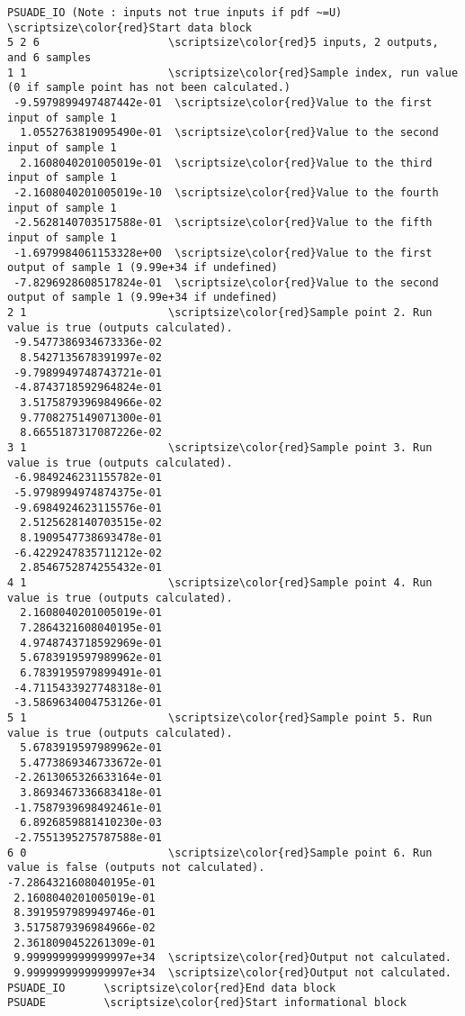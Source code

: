 \begin{Verbatim}[commandchars=\\\{\}]
PSUADE_IO (Note : inputs not true inputs if pdf ~=U) \scriptsize\color{red}Start data block
5 2 6                    \scriptsize\color{red}5 inputs, 2 outputs, and 6 samples
1 1                      \scriptsize\color{red}Sample index, run value (0 if sample point has not been calculated.)
 -9.5979899497487442e-01  \scriptsize\color{red}Value to the first input of sample 1
  1.0552763819095490e-01  \scriptsize\color{red}Value to the second input of sample 1
  2.1608040201005019e-01  \scriptsize\color{red}Value to the third input of sample 1
 -2.1608040201005019e-10  \scriptsize\color{red}Value to the fourth input of sample 1
 -2.5628140703517588e-01  \scriptsize\color{red}Value to the fifth input of sample 1
 -1.6979984061153328e+00  \scriptsize\color{red}Value to the first output of sample 1 (9.99e+34 if undefined)
 -7.8296928608517824e-01  \scriptsize\color{red}Value to the second output of sample 1 (9.99e+34 if undefined)
2 1                      \scriptsize\color{red}Sample point 2. Run value is true (outputs calculated).
 -9.5477386934673336e-02
  8.5427135678391997e-02
 -9.7989949748743721e-01
 -4.8743718592964824e-01
  3.5175879396984966e-02
  9.7708275149071300e-01
  8.6655187317087226e-02
3 1                      \scriptsize\color{red}Sample point 3. Run value is true (outputs calculated).
 -6.9849246231155782e-01 
 -5.9798994974874375e-01 
 -9.6984924623115576e-01
  2.5125628140703515e-02
  8.1909547738693478e-01
 -6.4229247835711212e-02
  2.8546752874255432e-01 
4 1                      \scriptsize\color{red}Sample point 4. Run value is true (outputs calculated).
  2.1608040201005019e-01
  7.2864321608040195e-01
  4.9748743718592969e-01
  5.6783919597989962e-01
  6.7839195979899491e-01
 -4.7115433927748318e-01
 -3.5869634004753126e-01 
5 1                      \scriptsize\color{red}Sample point 5. Run value is true (outputs calculated).
  5.6783919597989962e-01
  5.4773869346733672e-01
 -2.2613065326633164e-01
  3.8693467336683418e-01
 -1.7587939698492461e-01
  6.8926859881410230e-03
 -2.7551395275787588e-01
6 0                      \scriptsize\color{red}Sample point 6. Run value is false (outputs not calculated).
-7.2864321608040195e-01
 2.1608040201005019e-01
 8.3919597989949746e-01
 3.5175879396984966e-02
 2.3618090452261309e-01
 9.9999999999999997e+34  \scriptsize\color{red}Output not calculated.
 9.9999999999999997e+34  \scriptsize\color{red}Output not calculated. 
PSUADE_IO      \scriptsize\color{red}End data block
PSUADE         \scriptsize\color{red}Start informational block

\end{Verbatim}
